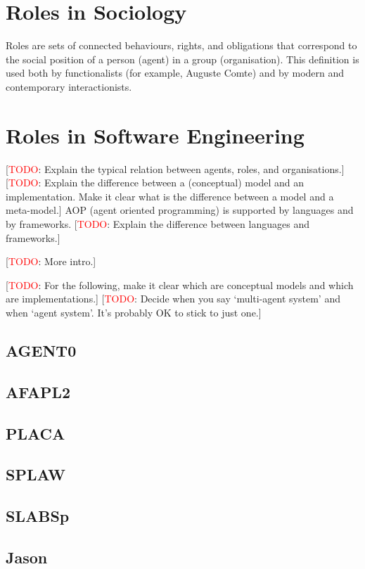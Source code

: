 \documentclass{article}
\newcommand{\todo}[1]{[\textcolor{red}{TODO}: #1]}
\begin{document}
\section{Roles in Sociology}

Roles are sets of connected behaviours, rights, and obligations
that correspond to the social position of a person (agent) in a
group (organisation). This definition is used both by functionalists
(for example, Auguste Comte) and by modern and contemporary
interactionists.
\section{Roles in Software Engineering}
\label{sec:software_engineering}

\todo{Explain the typical relation between agents, roles, and
  organisations.}
\todo{Explain the difference between a (conceptual) model and an
  implementation. Make it clear what is the difference between a
  model and a meta-model.}
AOP (agent oriented programming) is supported by languages and by
frameworks.  \todo{Explain the difference between languages and
frameworks.}


\todo{More intro.}

\todo{For the following, make it clear which are conceptual models and
  which are implementations.}
\todo{Decide when you say `multi-agent system' and when `agent system'.
  It's probably OK to stick to just one.}

\subsection{AGENT0}
\subsection{AFAPL2}
\subsection{PLACA}
\subsection{SPLAW}
\subsection{SLABSp}
\subsection{Jason}
\end{document}
